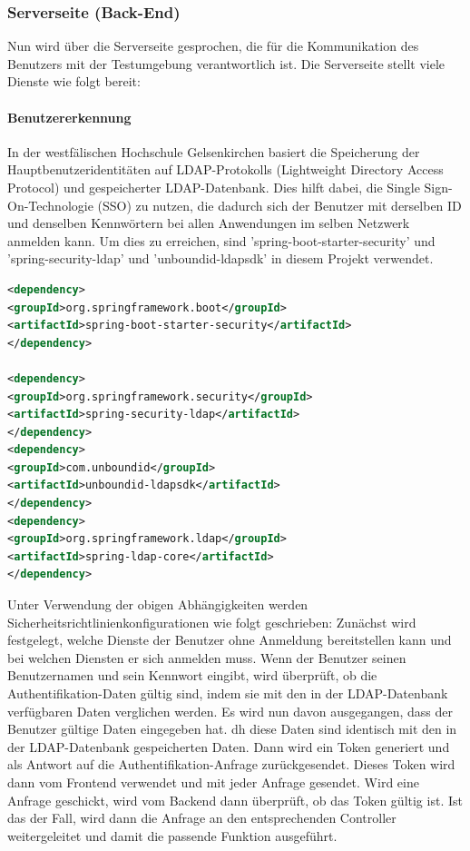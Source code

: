 \documentclass[apaper4,12p]{scrartcl}
\begin{document}
\subsubsection{Serverseite (Back-End)}
Nun wird über die Serverseite gesprochen, die für die Kommunikation des Benutzers mit der Testumgebung verantwortlich ist.
\newline
Die Serverseite stellt viele Dienste wie folgt bereit:
\paragraph{Benutzererkennung} In der westfälischen Hochschule Gelsenkirchen basiert die Speicherung der Hauptbenutzeridentitäten auf LDAP-Protokolls (Lightweight Directory Access Protocol) und gespeicherter LDAP-Datenbank. Dies hilft dabei, die Single Sign-On-Technologie (SSO) zu nutzen, die dadurch sich der Benutzer mit derselben ID und denselben Kennwörtern bei allen Anwendungen im selben Netzwerk anmelden kann. Um dies zu erreichen, sind 'spring-boot-starter-security' und 'spring-security-ldap' und 'unboundid-ldapsdk' in diesem Projekt verwendet.

\begin{lstlisting}[language=XML,caption=pom.xml - security dependencies]
<dependency>
<groupId>org.springframework.boot</groupId>
<artifactId>spring-boot-starter-security</artifactId>
</dependency>

<dependency>
<groupId>org.springframework.security</groupId>
<artifactId>spring-security-ldap</artifactId>
</dependency>
<dependency>
<groupId>com.unboundid</groupId>
<artifactId>unboundid-ldapsdk</artifactId>
</dependency>
<dependency>
<groupId>org.springframework.ldap</groupId>
<artifactId>spring-ldap-core</artifactId>
</dependency>
\end{lstlisting}
Unter Verwendung der obigen Abhängigkeiten werden Sicherheitsrichtlinienkonfigurationen wie folgt geschrieben: Zunächst wird festgelegt, welche Dienste der Benutzer ohne Anmeldung bereitstellen kann und bei welchen Diensten er sich anmelden muss. Wenn der Benutzer seinen Benutzernamen und sein Kennwort eingibt, wird überprüft, ob die Authentifikation-Daten gültig sind, indem sie mit den in der LDAP-Datenbank verfügbaren Daten verglichen werden.
\newline
Es wird nun davon ausgegangen, dass der Benutzer gültige Daten eingegeben hat. dh diese Daten sind identisch mit den in der LDAP-Datenbank gespeicherten Daten. Dann wird ein Token generiert und als Antwort auf die Authentifikation-Anfrage zurückgesendet. Dieses Token wird dann vom Frontend verwendet und mit jeder Anfrage gesendet.
\newline
Wird eine Anfrage geschickt, wird vom Backend dann überprüft, ob das Token gültig ist. Ist das der Fall, wird dann die Anfrage an den entsprechenden Controller weitergeleitet und damit die passende Funktion ausgeführt.
\end{document}
